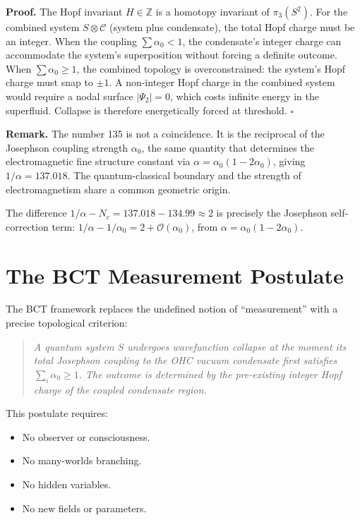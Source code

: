 \documentclass[aps,prl,twocolumn,superscriptaddress,showpacs]{revtex4-2}
\begin{document}
\textbf{Proof.} The Hopf invariant $H \in \mathbb{Z}$ is a homotopy 
invariant of $\pi_3(S^2)$. For the combined system $S \otimes \mathcal{C}$ 
(system plus condensate), the total Hopf charge must be an integer. When 
the coupling $\sum \alpha_0 < 1$, the condensate's integer charge can 
accommodate the system's superposition without forcing a definite outcome. 
When $\sum \alpha_0 \geq 1$, the combined topology is overconstrained: the 
system's Hopf charge must snap to $\pm 1$. A non-integer Hopf charge in 
the combined system would require a nodal surface $|\Psi_2| = 0$, which 
costs infinite energy in the superfluid. Collapse is therefore 
energetically forced at threshold. \hfill$\square$

\textbf{Remark.} The number 135 is not a coincidence. It is the reciprocal 
of the Josephson coupling strength $\alpha_0$, the same quantity that 
determines the electromagnetic fine structure constant via 
$\alpha = \alpha_0(1-2\alpha_0)$, giving $1/\alpha = 137.018$. The 
quantum-classical boundary and the strength of electromagnetism share a 
common geometric origin.

The difference $1/\alpha - N_c = 137.018 - 134.99 \approx 2$ is 
precisely the Josephson self-correction term: $1/\alpha - 1/\alpha_0 = 
2 + \mathcal{O}(\alpha_0)$, from $\alpha = \alpha_0(1 - 2\alpha_0)$.

\section{The BCT Measurement Postulate}

The BCT framework replaces the undefined notion of ``measurement'' with 
a precise topological criterion:

\begin{quote}
\textit{A quantum system $S$ undergoes wavefunction collapse at the moment 
its total Josephson coupling to the OHC vacuum condensate first satisfies 
$\sum_i \alpha_0 \geq 1$. The outcome is determined by the pre-existing 
integer Hopf charge of the coupled condensate region.}
\end{quote}

This postulate requires:
\begin{itemize}
\item No observer or consciousness.
\item No many-worlds branching.
\item No hidden variables.
\item No new fields or parameters.
\end{itemize}
\end{document}
